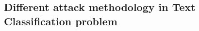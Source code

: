 \documentclass[%
	BCOR=8mm, %
	DIV=12, 
	toc=bibliography, %
	toc=listof, %
	oneside, %
	egregdoesnotlikesansseriftitles, %
	]{scrbook}
\begin{document}
 
\subsection{Different attack methodology in Text Classification problem}


\end{document}
